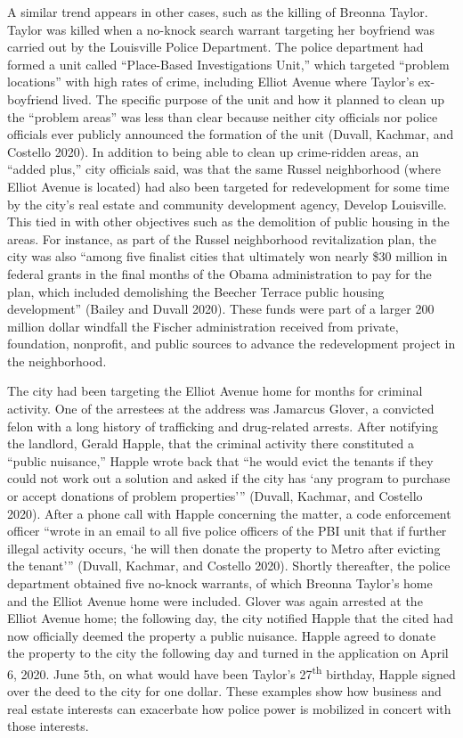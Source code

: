 \documentclass[12pt]{article}
\begin{document}
A similar trend appears in other cases, such as the killing of Breonna Taylor. Taylor was killed when a no-knock search warrant targeting her boyfriend was carried out by the Louisville Police Department. The police department had formed a unit called “Place-Based Investigations Unit,” which targeted “problem locations” with high rates of crime, including Elliot Avenue where Taylor’s ex-boyfriend lived. The specific purpose of the unit and how it planned to clean up the “problem areas” was less than clear because neither city officials nor police officials ever publicly announced the formation of the unit (Duvall, Kachmar, and Costello 2020). In addition to being able to clean up crime-ridden areas, an “added plus,” city officials said, was that the same Russel neighborhood (where Elliot Avenue is located) had also been targeted for redevelopment for some time by the city’s real estate and community development agency, Develop Louisville. This tied in with other objectives such as the demolition of public housing in the areas. For instance, as part of the Russel neighborhood revitalization plan, the city was also “among five finalist cities that ultimately won nearly \$30 million in federal grants in the final months of the Obama administration to pay for the plan, which included demolishing the Beecher Terrace public housing development” (Bailey and Duvall 2020). These funds were part of a larger 200 million dollar windfall the Fischer administration received from private, foundation, nonprofit, and public sources to advance the redevelopment project in the neighborhood. 

The city had been targeting the Elliot Avenue home for months for criminal activity. One of the arrestees at the address was Jamarcus Glover, a convicted felon with a long history of trafficking and drug-related arrests. After notifying the landlord, Gerald Happle, that the criminal activity there constituted a “public nuisance,” Happle wrote back that “he would evict the tenants if they could not work out a solution and asked if the city has ‘any program to purchase or accept donations of problem properties’” (Duvall, Kachmar, and Costello 2020). After a phone call with Happle concerning the matter, a code enforcement officer “wrote in an email to all five police officers of the PBI unit that if further illegal activity occurs, ‘he will then donate the property to Metro after evicting the tenant’” (Duvall, Kachmar, and Costello 2020). Shortly thereafter, the police department obtained five no-knock warrants, of which Breonna Taylor’s home and the Elliot Avenue home were included. Glover was again arrested at the Elliot Avenue home; the following day, the city notified Happle that the cited had now officially deemed the property a public nuisance. Happle agreed to donate the property to the city the following day and turned in the application on April 6, 2020. June 5th, on what would have been Taylor’s 27\textsuperscript{th} birthday, Happle signed over the deed to the city for one dollar. These examples show how business and real estate interests can exacerbate how police power is mobilized in concert with those interests.
\end{document}
